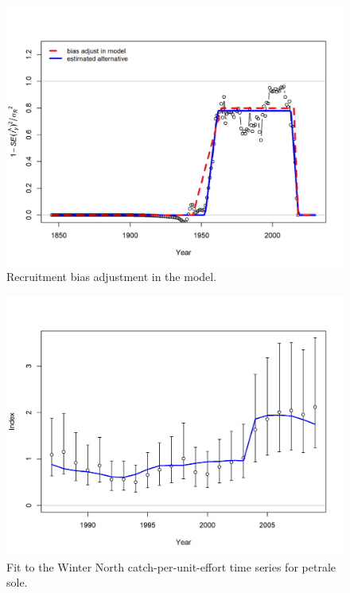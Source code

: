 \documentclass[12pt,]{article}
\begin{document}
\FloatBarrier

\begin{figure}
\centering
\includegraphics{r4ss/plots_mod1/recruit_fit_bias_adjust.png}
\caption{Recruitment bias adjustment in the model.
\label{fig:bias_adjust}}
\end{figure}

\FloatBarrier

\begin{figure}
\centering
\includegraphics{r4ss/plots_mod1/index2_cpuefit_Winter (N).png}
\caption{Fit to the Winter North catch-per-unit-effort time series for
petrale sole. \label{fig:fit_wn_cpue}}
\end{figure}
\end{document}
